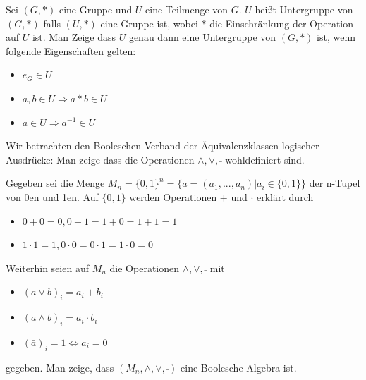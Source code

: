 \documentclass[10pt, a4paper]{exam}
\begin{document}
\begin{questions}
    \question Sei $(G,\ast)$ eine Gruppe und $U$ eine Teilmenge von $G$. $U$ heißt Untergruppe von $(G,\ast)$ falls $(U,\ast)$ eine Gruppe ist, wobei $\ast$ die Einschränkung der Operation auf $U$ ist. Man Zeige dass $U$ genau dann eine Untergruppe von $(G,\ast)$ ist, wenn folgende Eigenschaften gelten:
    \begin{itemize}
        \item $e_G\in U$
              \begin{solution}
              \end{solution}
        \item $a,b\in U \Rightarrow a \ast b \in U$
              \begin{solution}
              \end{solution}
        \item $a\in U\Rightarrow a^{-1}\in U$
              \begin{solution}
              \end{solution}
    \end{itemize}

    \question Wir betrachten den Booleschen Verband der Äquivalenzklassen logischer Ausdrücke: Man zeige dass die Operationen $\wedge, \vee,\bar{}$ wohldefiniert sind.
    \begin{solution}
    \end{solution}

    \question Gegeben sei die Menge $M_n=\{0,1\}^n =\{a=(a_1,...,a_n)|a_i\in\{0,1\}\}$ der n-Tupel von 0en und 1en. Auf $\{0,1\}$ werden Operationen $+$ und $\cdot$ erklärt durch
    \begin{itemize}
        \item $0 + 0 = 0, 0 + 1 = 1 + 0 = 1 + 1 = 1$
        \item $1 \cdot 1 = 1, 0 \cdot 0 = 0 \cdot 1 = 1 \cdot 0 = 0$
    \end{itemize}
    Weiterhin seien auf $M_n$ die Operationen $\wedge, \vee, \bar{}$ mit
    \begin{itemize}
        \item $(a\vee b)_i = a_i + b_i$
        \item $(a\wedge b)_i = a_i \cdot b_i$
        \item $(\bar{a})_i = 1 \Leftrightarrow a_i = 0$
    \end{itemize}
    gegeben. Man zeige, dass $(M_n,\wedge,\vee,\bar{})$ eine Boolesche Algebra ist.
    \begin{solution}
    \end{solution}


\end{questions}
\end{document}
